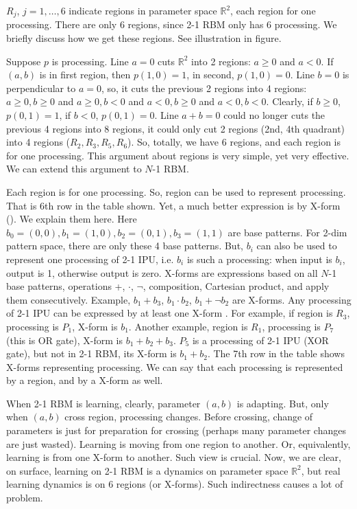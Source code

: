 $R_j$, $j=1, \ldots, 6$ indicate regions in parameter space $\mathbb{R}^2$, each region for one processing. There are only 6 regions, since 2-1 RBM only has 6 processing. We briefly discuss how we get these regions. See illustration in figure.

Suppose $p$ is processing. Line $a = 0$ cuts $\mathbb{R}^2$ into 2 regions: $a \ge 0$ and $a < 0$. If $(a, b)$ is in first region, then $p(1, 0) = 1$, in second, $p(1, 0) = 0$. Line $b = 0$ is perpendicular to $a=0$, so, it cuts the previous 2 regions into 4 regions: $a \ge 0, b \ge 0$ and $a \ge 0, b < 0$ and  $a < 0, b \ge 0$ and $a < 0, b < 0$. Clearly, if $b \ge 0$, $p(0, 1) = 1$, if $b < 0$, $p(0, 1) = 0$. Line $a + b = 0$ could no longer cuts the previous 4 regions into 8 regions, it could only cut 2 regions (2nd, 4th quadrant) into 4 regions ($R_2, R_3, R_5, R_6$). So, totally, we have 6 regions, and each region is for one processing. This argument about regions is very simple, yet very effective. We can extend this argument to $N$-1 RBM.
 
Each region is for one processing. So, region can be used to represent processing. That is 6th row in the table shown. Yet, a much better expression is by X-form (\cite{paper2}). We explain them here. 
Here $b_0 = (0, 0), b_1 = (1, 0), b_2 = (0, 1), b_3 = (1, 1)$ are base patterns. For 2-dim pattern space, there are only these 4 base patterns. But, $b_i$ can also be used to represent one processing of 2-1 IPU, i.e. $b_i$ is such a processing: when input is $b_i$, output is 1, otherwise output is zero. X-forms are expressions based on all $N$-1 base patterns, operations +, $\cdot$, $\neg$, composition, Cartesian product, and apply them consecutively. Example, $b_1 + b_3$, $b_1 \cdot b_2$, $b_1 + \neg b_2$ are X-forms. 
Any processing of 2-1 IPU can be expressed by at least one X-form \cite{paper2}. For example, if region is $R_3$, processing is $P_1$, X-form is $b_1$. 
Another example, region is $R_1$, processing is $P_7$ (this is OR gate), X-form is $b_1 + b_2 + b_3$. $P_5$ is a processing of 2-1 IPU (XOR gate), but not in 2-1 RBM, its X-form is $b_1 + b_2$.  
The 7th row in the table shows X-forms representing processing. We can say that each processing is represented by a region, and by a X-form as well.


When 2-1 RBM is learning, clearly, parameter $(a, b)$ is adapting. But, only when $(a, b)$ cross region, processing changes. Before crossing, change of parameters is just for preparation for crossing (perhaps many parameter changes are just wasted). Learning is moving from one region to another. Or, equivalently, learning is from one X-form to another. Such view is crucial. Now, we are clear, on surface, learning on 2-1 RBM is a dynamics on parameter space $\mathbb{R}^2$, but real learning dynamics is on 6 regions (or X-forms). Such indirectness causes a lot of problem. 
\bigskip





